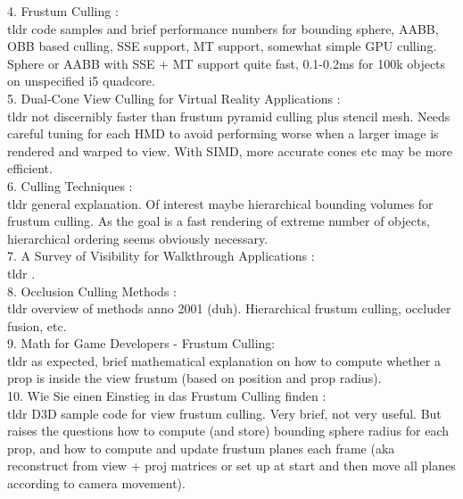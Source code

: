 4. Frustum Culling \cite{Gerlits.2017}: \\
tldr code samples and brief performance numbers for bounding sphere, AABB, OBB based culling, SSE support, MT support, somewhat simple GPU culling. Sphere or AABB with SSE + MT support quite fast, 0.1-0.2ms for 100k objects on unspecified i5 quadcore.\\

5. Dual-Cone View Culling for Virtual Reality Applications \cite{Hale.2018}: \\
tldr not discernibly faster than frustum pyramid culling plus stencil mesh. Needs careful tuning for each HMD to avoid performing worse when a larger image is rendered and warped to view. With SIMD, more accurate cones etc may be more efficient.\\

6. Culling Techniques \cite{ITCS.Subramanian}: \\
tldr general explanation. Of interest maybe hierarchical bounding volumes for frustum culling. As the goal is a fast rendering of extreme number of objects, hierarchical ordering seems obviously necessary.\\

7. A Survey of Visibility for Walkthrough Applications \cite{CohenOr.2003}: \\
tldr .\\

8. Occlusion Culling Methods \cite{Hey.2001}: \\
tldr overview of methods anno 2001 (duh). Hierarchical frustum culling, occluder fusion, etc.\\

9. Math for Game Developers - Frustum Culling\cite{Rodriguez.2013}: \\
tldr as expected, brief mathematical explanation on how to compute whether a prop is inside the view frustum (based on position and prop radius).\\

10. Wie Sie einen Einstieg in das Frustum Culling finden \cite{VisCircleGmbH.}: \\
tldr D3D sample code for view frustum culling. Very brief, not very useful. But raises the questions how to compute (and store) bounding sphere radius for each prop, and how to compute and update frustum planes each frame (aka reconstruct from view + proj matrices or set up at start and then move all planes according to camera movement).\\

